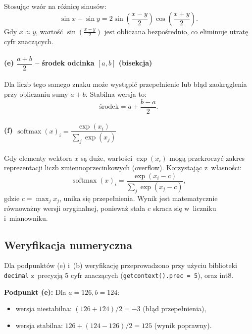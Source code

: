 \documentclass[12pt, a4paper]{article}
\begin{document}
Stosując wzór na różnicę sinusów:
\begin{equation}
  \sin x - \sin y = 2\sin\!\left(\frac{x-y}{2}\right)\cos\!\left(\frac{x+y}{2}\right).
\end{equation}
Gdy $x \approx y$, wartość $\sin\!\left(\frac{x-y}{2}\right)$ jest obliczana bezpośrednio, co eliminuje utratę cyfr znaczących.

\paragraph{(e) $\dfrac{a+b}{2}$ -- środek odcinka $[a,b]$ (bisekcja)}

Dla liczb tego samego znaku może wystąpić przepełnienie lub błąd zaokrąglenia przy obliczaniu sumy $a+b$. Stabilna wersja to:
\begin{equation}
  \text{środek} = a + \frac{b - a}{2}.
\end{equation}

\paragraph{(f) $\operatorname{softmax}(x)_i = \dfrac{\exp(x_i)}{\sum_j \exp(x_j)}$}

Gdy elementy wektora $x$ są duże, wartości $\exp(x_i)$ mogą przekroczyć zakres reprezentacji liczb zmiennoprzecinkowych (overflow). Korzystając z~własności:
\begin{equation}
  \operatorname{softmax}(x)_i = \frac{\exp(x_i - c)}{\sum_j \exp(x_j - c)},
\end{equation}
gdzie $c = \max_j x_j$, unika się przepełnienia. Wynik jest matematycznie równoważny wersji oryginalnej, ponieważ stała $c$ skraca się w~liczniku i~mianowniku.

\subsection{Weryfikacja numeryczna}

Dla podpunktów (e) i~(b) weryfikację przeprowadzono przy użyciu biblioteki \texttt{decimal} z~precyzją 5 cyfr znaczących (\texttt{getcontext().prec = 5}), oraz int8.

\textbf{Podpunkt (e):} Dla $a = 126, b=124$:
\begin{itemize}
  \item wersja niestabilna: $(126 + 124)/2 = -3$ (błąd przepełnienia),
  \item wersja stabilna: $126+ (124 - 126)/2 = 125$ (wynik poprawny).
\end{itemize}
\end{document}
